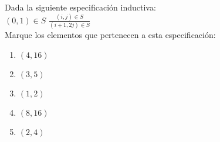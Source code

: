 {
Dada la siguiente especificación inductiva:\\
$(0,1) \in S$  $\frac{(i,j) \in S}{(i+1,2j) \in S}$ \\ 
Marque los elementos que pertenecen a esta especificación:

\begin{enumerate}
\item $(4,16)$ %
\item $(3,5)$
\item $(1,2)$ %
\item $(8,16)$
\item $(2,4)$ %
\end{enumerate}

}
